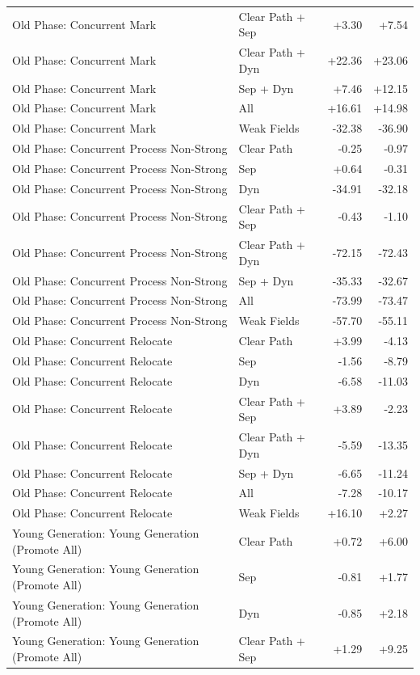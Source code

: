 \begin{table}[t]
\begin{tabular}{llrr}
Old Phase: Concurrent Mark & Clear Path + Sep & +3.30 & +7.54 \\
Old Phase: Concurrent Mark & Clear Path + Dyn & +22.36 & +23.06 \\
Old Phase: Concurrent Mark & Sep + Dyn & +7.46 & +12.15 \\
Old Phase: Concurrent Mark & All & +16.61 & +14.98 \\
Old Phase: Concurrent Mark & Weak Fields & -32.38 & -36.90 \\
Old Phase: Concurrent Process Non-Strong & Clear Path & -0.25 & -0.97 \\
Old Phase: Concurrent Process Non-Strong & Sep & +0.64 & -0.31 \\
Old Phase: Concurrent Process Non-Strong & Dyn & -34.91 & -32.18 \\
Old Phase: Concurrent Process Non-Strong & Clear Path + Sep & -0.43 & -1.10 \\
Old Phase: Concurrent Process Non-Strong & Clear Path + Dyn & -72.15 & -72.43 \\
Old Phase: Concurrent Process Non-Strong & Sep + Dyn & -35.33 & -32.67 \\
Old Phase: Concurrent Process Non-Strong & All & -73.99 & -73.47 \\
Old Phase: Concurrent Process Non-Strong & Weak Fields & -57.70 & -55.11 \\
Old Phase: Concurrent Relocate & Clear Path & +3.99 & -4.13 \\
Old Phase: Concurrent Relocate & Sep & -1.56 & -8.79 \\
Old Phase: Concurrent Relocate & Dyn & -6.58 & -11.03 \\
Old Phase: Concurrent Relocate & Clear Path + Sep & +3.89 & -2.23 \\
Old Phase: Concurrent Relocate & Clear Path + Dyn & -5.59 & -13.35 \\
Old Phase: Concurrent Relocate & Sep + Dyn & -6.65 & -11.24 \\
Old Phase: Concurrent Relocate & All & -7.28 & -10.17 \\
Old Phase: Concurrent Relocate & Weak Fields & +16.10 & +2.27 \\
Young Generation: Young Generation (Promote All) & Clear Path & +0.72 & +6.00 \\
Young Generation: Young Generation (Promote All) & Sep & -0.81 & +1.77 \\
Young Generation: Young Generation (Promote All) & Dyn & -0.85 & +2.18 \\
Young Generation: Young Generation (Promote All) & Clear Path + Sep & +1.29 & +9.25 \\

\end{tabular}
\end{table}
